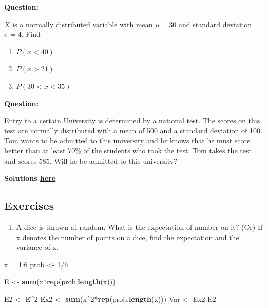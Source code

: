 \documentclass[]{article}
\def\tightlist{}
\newenvironment{Shaded}{\begin{snugshade}}{\end{snugshade}}
\newcommand{\KeywordTok}[1]{\textcolor[rgb]{0.13,0.29,0.53}{\textbf{{#1}}}}
\newcommand{\DecValTok}[1]{\textcolor[rgb]{0.00,0.00,0.81}{{#1}}}
\newcommand{\StringTok}[1]{\textcolor[rgb]{0.31,0.60,0.02}{{#1}}}
\newcommand{\NormalTok}[1]{{#1}}
\numberwithin{equation}{section}
\begin{document}
\textbf{Question:}

\(X\) is a normally distributed variable with mean \(\mu = 30\) and
standard deviation \(\sigma = 4\). Find

\begin{enumerate}
\def\labelenumi{\alph{enumi})}
\item
  \(P(x<40)\)
\item
  \(P(x>21)\)
\item
  \(P(30<x<35)\)
\end{enumerate}

\textbf{Question:}

Entry to a certain University is determined by a national test. The
scores on this test are normally distributed with a mean of 500 and a
standard deviation of 100. Tom wants to be admitted to this university
and he knows that he must score better than at least 70\% of the
students who took the test. Tom takes the test and scores 585. Will he
be admitted to this university?

\textbf{Solutions \href{IntroSM_sol.html}{here}}

\subsection{Exercises}\label{exercises}

\begin{enumerate}
\def\labelenumi{\arabic{enumi}.}
\tightlist
\item
  A dice is thrown at random. What is the expectation of number on it?
  (Or) If x denotes the number of points on a dice, find the expectation
  and the variance of x.
\end{enumerate}

\begin{Shaded}
\begin{Highlighting}[]
\NormalTok{x =}\StringTok{ }\DecValTok{1}\NormalTok{:}\DecValTok{6}
\NormalTok{prob <-}\StringTok{ }\DecValTok{1}\NormalTok{/}\DecValTok{6}

 \NormalTok{E  <-}\StringTok{ }\KeywordTok{sum}\NormalTok{(x*}\KeywordTok{rep}\NormalTok{(prob,}\KeywordTok{length}\NormalTok{(x)))}
 
 \NormalTok{E2 <-}\StringTok{ }\NormalTok{E^}\DecValTok{2}
 \NormalTok{Ex2 <-}\StringTok{ }\KeywordTok{sum}\NormalTok{(x^}\DecValTok{2}\NormalTok{*}\KeywordTok{rep}\NormalTok{(prob,}\KeywordTok{length}\NormalTok{(x)))}
\NormalTok{Var <-}\StringTok{ }\NormalTok{Ex2-E2}
\end{Highlighting}
\end{Shaded}
\end{document}
